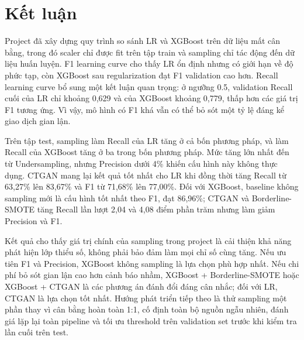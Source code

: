 \documentclass[12pt,a4paper]{article}
\begin{document}
\section{Kết luận}

Project đã xây dựng quy trình so sánh LR và XGBoost trên dữ liệu mất cân bằng, trong đó scaler chỉ được fit trên tập train và sampling chỉ tác động đến dữ liệu huấn luyện. F1 learning curve cho thấy LR ổn định nhưng có giới hạn về độ phức tạp, còn XGBoost sau regularization đạt F1 validation cao hơn. Recall learning curve bổ sung một kết luận quan trọng: ở ngưỡng 0.5, validation Recall cuối của LR chỉ khoảng 0,629 và của XGBoost khoảng 0,779, thấp hơn các giá trị F1 tương ứng. Vì vậy, mô hình có F1 khá vẫn có thể bỏ sót một tỷ lệ đáng kể giao dịch gian lận.

Trên tập test, sampling làm Recall của LR tăng ở cả bốn phương pháp, và làm Recall của XGBoost tăng ở ba trong bốn phương pháp. Mức tăng lớn nhất đến từ Undersampling, nhưng Precision dưới 4\% khiến cấu hình này không thực dụng. CTGAN mang lại kết quả tốt nhất cho LR khi đồng thời tăng Recall từ 63,27\% lên 83,67\% và F1 từ 71,68\% lên 77,00\%. Đối với XGBoost, baseline không sampling mới là cấu hình tốt nhất theo F1, đạt 86,96\%; CTGAN và Borderline-SMOTE tăng Recall lần lượt 2,04 và 4,08 điểm phần trăm nhưng làm giảm Precision và F1.

Kết quả cho thấy giá trị chính của sampling trong project là cải thiện khả năng phát hiện lớp thiểu số, không phải bảo đảm làm mọi chỉ số cùng tăng. Nếu ưu tiên F1 và Precision, XGBoost không sampling là lựa chọn phù hợp nhất. Nếu chi phí bỏ sót gian lận cao hơn cảnh báo nhầm, XGBoost + Borderline-SMOTE hoặc XGBoost + CTGAN là các phương án đánh đổi đáng cân nhắc; đối với LR, CTGAN là lựa chọn tốt nhất. Hướng phát triển tiếp theo là thử sampling một phần thay vì cân bằng hoàn toàn 1:1, cố định toàn bộ nguồn ngẫu nhiên, đánh giá lặp lại toàn pipeline và tối ưu threshold trên validation set trước khi kiểm tra lần cuối trên test.
\end{document}
